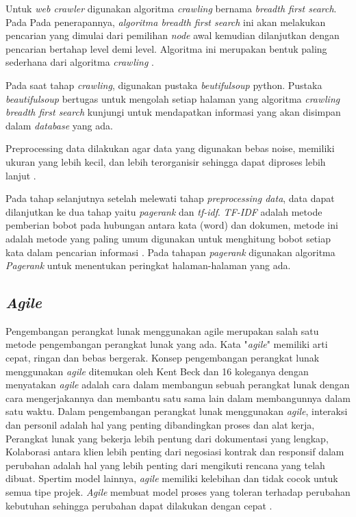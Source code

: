 \documentclass[
	a4paper, %
	10pt, %
	unnumberedsections, %
	twoside, %
]{LTJournalArticle}
\begin{document}
Untuk \textit{web crawler} digunakan algoritma \textit{crawling} bernama \textit{breadth first search}. Pada Pada penerapannya, \textit{algoritma breadth first search} ini akan melakukan pencarian yang dimulai dari pemilihan \textit{node} awal kemudian dilanjutkan dengan pencarian bertahap level demi level. Algoritma ini merupakan bentuk paling sederhana dari algoritma \textit{crawling} \cite{lazu}. 

Pada saat tahap \textit{crawling}, digunakan pustaka \textit{beutifulsoup} python. Pustaka \textit{beautifulsoup} bertugas untuk mengolah setiap halaman yang algoritma \textit{crawling breadth first search} kunjungi untuk mendapatkan informasi yang akan disimpan dalam \textit{database} yang ada.

Preprocessing data dilakukan agar data yang digunakan bebas noise, memiliki ukuran yang lebih kecil, dan lebih terorganisir sehingga dapat diproses lebih lanjut \cite{lazu}.

Pada tahap selanjutnya setelah melewati tahap \textit{preprocessing data}, data dapat dilanjutkan ke dua tahap yaitu \textit{pagerank} dan \textit{tf-idf}. \textit{TF-IDF} adalah metode pemberian bobot pada hubungan antara kata (word) dan dokumen, metode ini adalah metode yang paling umum digunakan untuk menghitung bobot setiap kata dalam pencarian informasi \cite{lazu}. Pada tahapan \textit{pagerank} digunakan algoritma \textit{Pagerank} untuk menentukan peringkat halaman-halaman yang ada.


\subsection{\textit{Agile}}
Pengembangan perangkat lunak menggunakan agile merupakan salah satu metode pengembangan perangkat lunak yang ada. Kata "\textit{agile}" memiliki arti cepat, ringan dan bebas bergerak. Konsep pengembangan perangkat lunak menggunakan \textit{agile} ditemukan oleh Kent Beck dan 16 koleganya dengan menyatakan \textit{agile} adalah cara dalam membangun sebuah perangkat lunak dengan cara mengerjakannya dan membantu satu sama lain dalam membangunnya dalam satu waktu. Dalam pengembangan perangkat lunak menggunakan \textit{agile}, interaksi dan personil adalah hal yang penting dibandingkan proses dan alat kerja, Perangkat lunak yang bekerja lebih pentung dari dokumentasi yang lengkap, Kolaborasi antara klien lebih penting dari negosiasi kontrak dan responsif dalam perubahan adalah hal yang lebih penting dari mengikuti rencana yang telah dibuat. Spertim model lainnya, \textit{agile} memiliki kelebihan dan tidak cocok untuk semua tipe projek. \textit{Agile} membuat model proses yang toleran terhadap perubahan kebutuhan sehingga perubahan dapat dilakukan dengan cepat \cite{scrum}.
\end{document}

